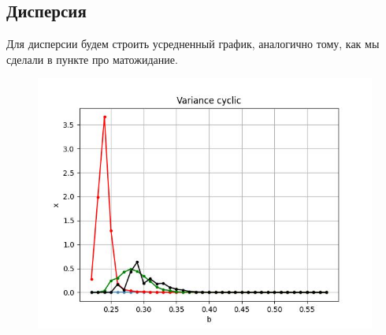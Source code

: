 \subsection{Дисперсия}

    Для дисперсии будем строить усредненный график, аналогично тому, как мы сделали в пункте про матожидание.

        
    \begin{figure}
        \centering
        \includegraphics[width=\textwidth]{stochastic/images/variance_cyclic.jpg}
        
        \captionsetup{justification=centering}
        \caption{}
        \label{variance_cyclic}
    \end{figure}